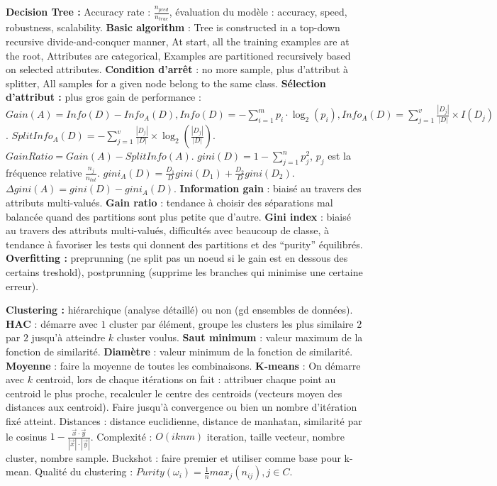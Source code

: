 \documentclass[9pt,a4paper]{report}
\begin{document}
\textbf{Decision Tree :} Accuracy rate : $\frac{n_{pred}}{n_{true}}$, évaluation du modèle : accuracy, speed, robustness, scalability. \textbf{Basic algorithm} : Tree is constructed in a top-down recursive divide-and-conquer manner, At start, all the training examples are at the root, Attributes are categorical, Examples are partitioned recursively based on selected attributes. \textbf{Condition d'arrêt} : no more sample, plus d'attribut à splitter, All samples for a given node belong to the same class. \textbf{Sélection d'attribut :} plus gros gain de performance : $Gain(A)=Info(D)-Info_A(D), Info(D)=-\sum_{i=1}^mp_i\cdot\log_2(p_i), Info_A(D)=\sum_{j=1}^v\frac{|D_j|}{|D|}\times I(D_j)$. $SplitInfo_A(D)=-\sum_{j=1}^v\frac{|D_j|}{|D|}\times\log_2(\frac{|D_j|}{|D|})$. $GainRatio = Gain(A)-SplitInfo(A)$. $gini(D)=1-\sum_{j=1}^np^2_j$, $p_j$ est la fréquence relative $\frac{n_j}{n_{tot}}$. $gini_A(D)=\frac{D_1}{D}gini(D_1)+\frac{D_2}{D}gini(D_2)$. $\Delta gini(A)=gini(D)-gini_A(D)$.
\textbf{Information gain} : biaisé au travers des attributs multi-valués.
\textbf{Gain ratio} : tendance à choisir des séparations mal balancée quand des partitions sont plus petite que d’autre.
\textbf{Gini index} : biaisé au travers des attributs multi-valués, difficultés avec beaucoup de classe, à tendance à favoriser les tests qui donnent des partitions et des “purity” équilibrés.
\textbf{Overfitting :} preprunning (ne split pas un noeud si le gain est en dessous des certains treshold), postprunning (supprime les branches qui minimise une certaine erreur).

\textbf{Clustering :} hiérarchique (analyse détaillé) ou non (gd ensembles de données). \textbf{HAC} : démarre avec $1$ cluster par élément, groupe les clusters les plus similaire $2$ par $2$ jusqu'à atteindre $k$ cluster voulus. \textbf{Saut minimum} : valeur maximum de la fonction de similarité. \textbf{Diamètre} : valeur minimum de la fonction de similarité. \textbf{Moyenne} : faire la moyenne de toutes les combinaisons. \textbf{K-means} : On démarre avec $k$ centroid, lors de chaque itérations on fait : attribuer chaque point au centroid le plus proche, recalculer le centre des centroids (vecteurs moyen des distances aux centroid). Faire jusqu'à convergence ou bien un nombre d'itération fixé atteint. Distances : distance euclidienne, distance de manhatan, similarité par le cosinus $1-\frac{\vec{x}\cdot\vec{y}}{|\vec{x}|\cdot|\vec{y}|}$. Complexité : $O(iknm)$ iteration, taille vecteur, nombre cluster, nombre sample. Buckshot : faire premier et utiliser comme base pour k-mean. Qualité du clustering : $Purity(\omega_i)=\frac{1}{n}max_j(n_{ij}), j\in C$.
\end{document}
